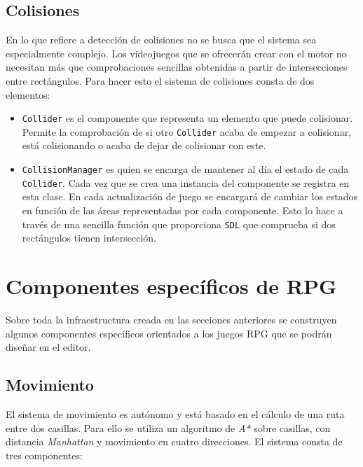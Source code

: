 \subsection{Colisiones}
En lo que refiere a detección de colisiones no se busca que el sistema sea especialmente complejo. Los videojuegos que se ofrecerán crear con el motor no necesitan más que comprobaciones sencillas obtenidas a partir de intersecciones entre rectángulos. Para hacer esto el sistema de colisiones consta de dos elementos: 

\begin{itemize}
	\item \texttt{Collider} es el componente que representa un elemento que puede colisionar. Permite la comprobación de si otro \texttt{Collider} acaba de empezar a colisionar, está colisionando o acaba de dejar de colisionar con este. 
	\item \texttt{CollisionManager} es quien se encarga de mantener al día el estado de cada \texttt{Collider}. Cada vez que se crea una instancia del componente se registra en esta clase. En cada actualización de juego se encargará de cambiar los estados en función de las áreas representadas por cada componente. Esto lo hace a través de una sencilla función que proporciona \texttt{SDL} que comprueba si dos rectángulos tienen intersección.
\end{itemize}

\section{Componentes específicos de RPG}
Sobre toda la infraestructura creada en las secciones anteriores se construyen algunos componentes específicos orientados a los juegos RPG que se podrán diseñar en el editor. 

\subsection{Movimiento}
El sistema de movimiento es autónomo y está basado en el cálculo de una ruta entre dos casillas. Para ello se utiliza un algoritmo de \textit{A*} sobre casillas, con distancia \textit{Manhattan} y movimiento en cuatro direcciones. El sistema consta de tres componentes: 


